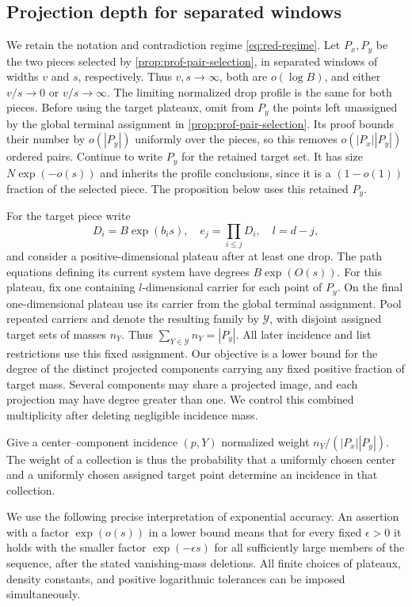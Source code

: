 \subsection{Projection depth for separated windows}\label{subsec:dep-section}

We retain the notation and contradiction regime \eqref{eq:red-regime}. Let $P_x,P_y$ be the two pieces selected by \cref{prop:prof-pair-selection}, in separated windows of widths $v$ and $s$, respectively. Thus $v,s\to\infty$, both are $o(\log B)$, and either $v/s\to0$ or $v/s\to\infty$. The limiting normalized drop profile is the same for both pieces. Before using the target plateaux, omit from $P_y$ the points left unassigned by the global terminal assignment in \cref{prop:prof-pair-selection}. Its proof bounds their number by $o(|P_y|)$ uniformly over the pieces, so this removes $o(|P_x||P_y|)$ ordered pairs. Continue to write $P_y$ for the retained target set. It has size $N\exp(-o(s))$ and inherits the profile conclusions, since it is a $(1-o(1))$ fraction of the selected piece. The proposition below uses this retained $P_y$.

For the target piece write
\[
 D_i=B\exp(b_i s),\quad e_j=\prod_{i\le j}D_i,
 \quad l=d-j,
\]
and consider a positive-dimensional plateau after at least one drop. The path equations defining its current system have degrees $B\exp(O(s))$. For this plateau, fix one containing $l$-dimensional carrier for each point of $P_y$. On the final one-dimensional plateau use its carrier from the global terminal assignment. Pool repeated carriers and denote the resulting family by $\mathcal{Y}$, with disjoint assigned target sets of masses $n_Y$. Thus $\sum_{Y\in\mathcal{Y}}n_Y=|P_y|$. All later incidence and list restrictions use this fixed assignment. Our objective is a lower bound for the degree of the distinct projected components carrying any fixed positive fraction of target mass.  Several components may share a projected image, and each projection may have degree greater than one.  We control this combined multiplicity after deleting negligible incidence mass.

Give a center--component incidence $(p,Y)$ normalized weight $n_Y/(|P_x||P_y|)$.  The weight of a collection is thus the probability that a uniformly chosen center and a uniformly chosen assigned target point determine an incidence in that collection.

We use the following precise interpretation of exponential accuracy. An assertion with a factor $\exp(o(s))$ in a lower bound means that for every fixed $\epsilon>0$ it holds with the smaller factor $\exp(-\epsilon s)$ for all sufficiently large members of the sequence, after the stated vanishing-mass deletions. All finite choices of plateaux, density constants, and positive logarithmic tolerances can be imposed simultaneously.

